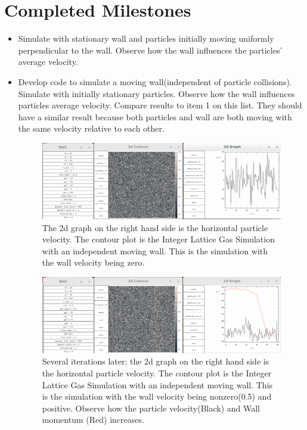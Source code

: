 \documentclass{article}
\begin{document}
\section{Completed Milestones}
\begin{itemize}
  \item Simulate with stationary wall and particles initially moving uniformly perpendicular to the wall. Observe how the wall influences the particles' average velocity.
 
    
  \item Develop code to simulate a moving wall(independent of particle collisions). Simulate with initially stationary particles. Observe how the wall influences particles average velocity. Compare results to item 1 on this list. They should have a similar result because both particles and wall are both moving with the same velocity relative to each other.
\begin{figure}

\includegraphics[scale=0.2]{ms1p0.png}
\caption{\label{fig} The 2d graph on the right hand side is the horizontal particle velocity. The contour plot is the Integer Lattice Gas Simulation with an independent moving wall. This is the simulation with the wall velocity being zero.}
\end{figure} 

\begin{figure}

\includegraphics[scale=0.2]{ms1p1.png}
\caption{\label{fig} Several iterations later: the 2d graph on the right hand side is the horizontal particle velocity. The contour plot is the Integer Lattice Gas Simulation with an independent moving wall. This is the simulation with the wall velocity being nonzero(0.5) and positive. Observe how the particle velocity(Black) and Wall momentum (Red) increases.}
\end{figure}


\end{itemize}
\end{document}
